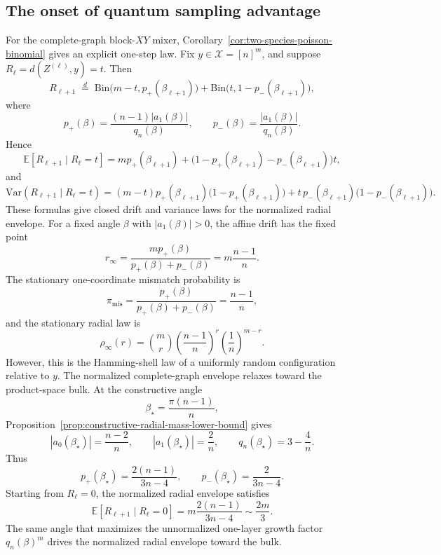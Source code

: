 \documentclass[a4paper,onecolumn,11pt,unpublished]{quantumarticle}
\theoremstyle{remark}
\begin{document}
\subsection{The onset of quantum sampling advantage}
\label{subsec:probabilistic-normalized-shell-kernel}
For the complete-graph block-\(XY\) mixer, Corollary~\ref{cor:two-species-poisson-binomial}
gives an explicit one-step law.  Fix \(y\in \mathcal X=[n]^m\), and suppose
\(R_\ell=d(Z^{(\ell)},y)=t\).  Then
\[
R_{\ell+1}
\;\stackrel{d}{=}\;
\mathrm{Bin}\bigl(m-t,p_+(\beta_{\ell+1})\bigr)
+
\mathrm{Bin}\bigl(t,1-p_-(\beta_{\ell+1})\bigr),
\]
where
\[
p_+(\beta)
=
\frac{(n-1)|a_1(\beta)|}{q_n(\beta)},
\qquad
p_-(\beta)
=
\frac{|a_1(\beta)|}{q_n(\beta)}.
\]
Hence
\[
\mathbb E[R_{\ell+1}\mid R_\ell=t]
=
m p_+(\beta_{\ell+1})
+
\bigl(1-p_+(\beta_{\ell+1})-p_-(\beta_{\ell+1})\bigr)t,
\]
and
\[
\mathrm{Var}(R_{\ell+1}\mid R_\ell=t)
=
(m-t)p_+(\beta_{\ell+1})\bigl(1-p_+(\beta_{\ell+1})\bigr)
+
t\,p_-(\beta_{\ell+1})\bigl(1-p_-(\beta_{\ell+1})\bigr).
\]
These formulas give closed drift and variance laws for the normalized radial envelope. For a fixed angle \(\beta\) with \(|a_1(\beta)|>0\), the affine drift has the
fixed point
\[
r_\infty
=
\frac{m p_+(\beta)}{p_+(\beta)+p_-(\beta)}
=
m\frac{n-1}{n}.
\]
The stationary one-coordinate mismatch probability is
\[
\pi_{\mathrm{mis}}
=
\frac{p_+(\beta)}{p_+(\beta)+p_-(\beta)}
=
\frac{n-1}{n},
\]
and the stationary radial law is
\[
\rho_\infty(r)
=
\binom{m}{r}
\left(\frac{n-1}{n}\right)^r
\left(\frac{1}{n}\right)^{m-r}.
\]
However, this is the Hamming-shell law of a uniformly random configuration relative to
\(y\).  The normalized complete-graph envelope relaxes toward the product-space bulk. At the constructive angle
\[
\beta_\star=\frac{\pi(n-1)}{n},
\]
Proposition~\ref{prop:constructive-radial-mass-lower-bound} gives
\[
|a_0(\beta_\star)|=\frac{n-2}{n},
\qquad
|a_1(\beta_\star)|=\frac{2}{n},
\qquad
q_n(\beta_\star)=3-\frac{4}{n}.
\]
Thus
\[
p_+(\beta_\star)
=
\frac{2(n-1)}{3n-4},
\qquad
p_-(\beta_\star)
=
\frac{2}{3n-4}.
\]
Starting from \(R_\ell=0\), the normalized radial envelope satisfies
\[
\mathbb E[R_{\ell+1}\mid R_\ell=0]
=
m\frac{2(n-1)}{3n-4}
\sim
\frac{2m}{3}.
\]
The same angle that maximizes the unnormalized one-layer growth factor
\(q_n(\beta)^m\) drives the normalized radial envelope toward the bulk.
\end{document}
